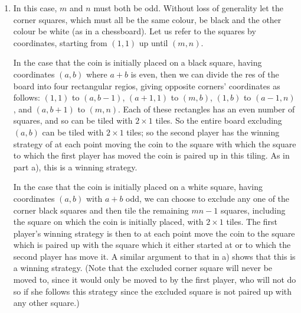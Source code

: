 \documentclass[a4paper, 12pt]{article}
\begin{document}
\begin{enumerate}
\begin{enumerate}
\item In this case, $m$ and $n$ must both be odd. Without loss of generality let the corner squares, which must all be the same colour, be black and the other colour be white (as in a chessboard). Let us refer to the squares by coordinates, starting from $(1, 1)$ up until $(m, n)$.

In the case that the coin is initially placed on a black square, having coordinates $(a, b)$ where $a + b$ is even, then we can divide the res of the board into four rectangular regios, giving opposite corners' coordinates as follows: $(1, 1)$ to $(a, b - 1)$, $(a + 1, 1)$ to $(m, b)$, $(1, b)$ to $(a - 1, n)$, and $(a, b + 1)$ to $(m, n)$. Each of these rectangles has an even number of squares, and so can be tiled with $2 \times 1$ tiles. So the entire board excluding $(a, b)$ can be tiled with $2 \times 1$ tiles; so the second player has the winning strategy of at each point moving the coin to the square with which the square to which the first player has moved the coin is paired up in this tiling. As in part a), this is a winning strategy.

In the case that the coin is initially placed on a white square, having coordinates $(a, b)$ with $a + b$ odd, we can choose to exclude any one of the corner black squares and then tile the remaining $mn - 1$ squares, including the square on which the coin is initially placed, with $2 \times 1$ tiles. The first player's winning strategy is then to at each point move the coin to the square which is paired up with the square which it either started at or to which the second player has move it. A similar argument to that in a) shows that this is a winning strategy. (Note that the excluded corner square will never be moved to, since it would only be moved to by the first player, who will not do so if she follows this strategy since the excluded square is not paired up with any other square.)

\end{enumerate}


\end{enumerate}

\vfill

\centering

\vspace{12mm}
\end{document}
